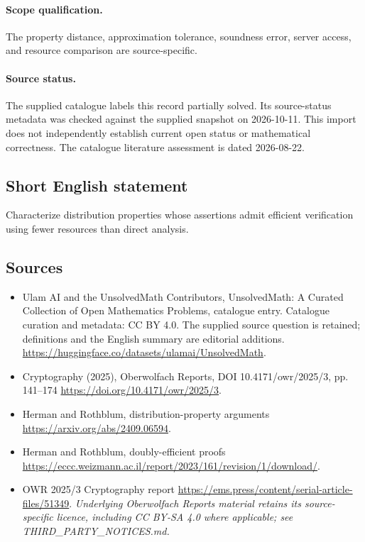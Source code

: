 \documentclass[11pt]{article}
\begin{document}
\paragraph{Scope qualification.}
The property distance, approximation tolerance, soundness error, server access, and resource comparison are source-specific.
\paragraph{Source status.}
The supplied catalogue labels this record partially solved. Its source-status metadata was checked against the supplied snapshot on 2026-10-11. This import does not independently establish current open status or mathematical correctness. The catalogue literature assessment is dated 2026-08-22.
\subsection{Short English statement}
Characterize distribution properties whose assertions admit efficient verification using fewer resources than direct analysis.
\subsection{Sources}
\begin{itemize}
\item[S1] Ulam AI and the UnsolvedMath Contributors, UnsolvedMath: A Curated Collection of Open Mathematics Problems, catalogue entry. Catalogue curation and metadata: CC BY 4.0. The supplied source question is retained; definitions and the English summary are editorial additions.
\url{https://huggingface.co/datasets/ulamai/UnsolvedMath}.
\item[S2] Cryptography (2025), Oberwolfach Reports, DOI 10.4171/owr/2025/3, pp. 141--174
\url{https://doi.org/10.4171/owr/2025/3}.
\item[S3] Herman and Rothblum, distribution-property arguments
\url{https://arxiv.org/abs/2409.06594}.
\item[S4] Herman and Rothblum, doubly-efficient proofs
\url{https://eccc.weizmann.ac.il/report/2023/161/revision/1/download/}.
\item[S5] OWR 2025/3 Cryptography report
\url{https://ems.press/content/serial-article-files/51349}.
\textit{Underlying Oberwolfach Reports material retains its source-specific licence, including CC BY-SA 4.0 where applicable; see THIRD\_PARTY\_NOTICES.md.}
\end{itemize}
\end{document}
